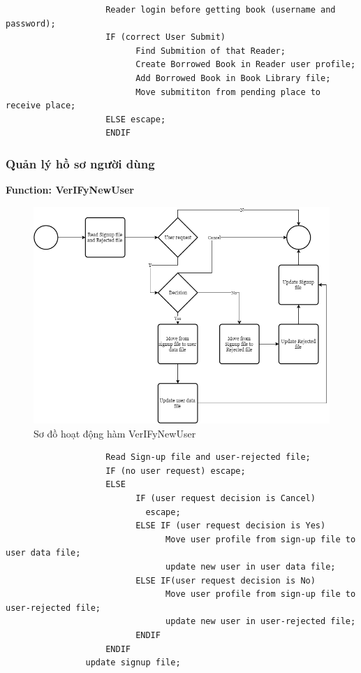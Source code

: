 \documentclass[12pt,a4paper]{report}
\begin{document}
                \begin{verbatim}
                    Reader login before getting book (username and password);
                    IF (correct User Submit)
                          Find Submition of that Reader;
                          Create Borrowed Book in Reader user profile;
                          Add Borrowed Book in Book Library file;
                          Move submititon from pending place to receive place;
                    ELSE escape;
                    ENDIF
                \end{verbatim}
            \subsubsection{Quản lý hồ sơ người dùng}
                \textbf{Function: VerIFyNewUser}
                \begin{figure}[H]
                    \centering
                    \label{F:adduser}
                    \includegraphics[scale = .4]{adduser.png}
                    \caption{Sơ đồ hoạt động hàm VerIFyNewUser}
                \end{figure}
                \begin{verbatim}
                    Read Sign-up file and user-rejected file;
                    IF (no user request) escape;
                    ELSE
                          IF (user request decision is Cancel)
                            escape;
                          ELSE IF (user request decision is Yes)
                                Move user profile from sign-up file to user data file;
                                update new user in user data file;
                          ELSE IF(user request decision is No)
                                Move user profile from sign-up file to user-rejected file;
                                update new user in user-rejected file;
                          ENDIF
                    ENDIF
                update signup file;
                \end{verbatim}
\end{document}

